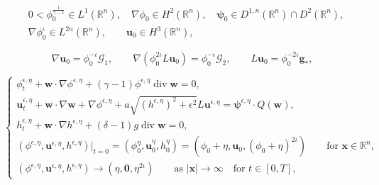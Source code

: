 \documentclass[10pt,a4paper]{amsart}
\DeclareMathOperator{\diver}{\mathrm{div}}
\begin{document}
\begin{equation}\label{th78qq}
\begin{aligned}
&0<\phi_0^\frac{1}{\gamma-1}\in L^1(\mathbb{R}^n),\quad \nabla\phi_0\in H^2 (\mathbb{R}^n),\quad \boldsymbol{\psi}_0 \in  D^{1,n}(\mathbb{R}^n)\cap  D^2(\mathbb{R}^n),\\
&\nabla\phi_0^\iota\in L^{2n}(\mathbb{R}^n),\qquad \boldsymbol{u}_0\in H^3(\mathbb{R}^n),
\end{aligned}
\end{equation}

\begin{equation}\label{th78zxq}
\nabla \boldsymbol{u}_0=\phi^{-\iota}_0 \mathcal{G}_1,\qquad
\nabla (\phi^{2\iota}_0L\boldsymbol{u}_0)=\phi^{-\iota}_0\mathcal{G}_2,\qquad  L\boldsymbol{u}_0= \phi^{-2\iota}_0\boldsymbol{g}_*,
\end{equation}

\begin{equation}\label{ln}
\begin{cases}
\phi^{\epsilon,\eta}_t+\boldsymbol{w}\cdot\nabla\phi^{\epsilon,\eta}+(\gamma-1)\phi^{\epsilon,\eta} \diver\boldsymbol{w}=0,\\[3pt]
\boldsymbol{u}^{\epsilon,\eta}_t+\boldsymbol{w}\cdot \nabla \boldsymbol{w}+\nabla\phi^{\epsilon,\eta}+a \sqrt {(h^{\epsilon,\eta})^2+\epsilon^2} L\boldsymbol{u}^{\epsilon,\eta}=\boldsymbol{\psi}^{\epsilon,\eta} \cdot Q(\boldsymbol{w}),\\[3pt]
h^{\epsilon,\eta}_t+\boldsymbol{w}\cdot \nabla h^{\epsilon,\eta}+(\delta-1)g\diver\boldsymbol{w}=0,\\[3pt]
(\phi^{\epsilon,\eta},\boldsymbol{u}^{\epsilon,\eta},h^{\epsilon,\eta})|_{t=0}=(\phi^\eta_0,\boldsymbol{u}^\eta_0,h^\eta_0)=(\phi_0+\eta,\boldsymbol{u}_0,(\phi_0+\eta)^{2\iota})\qquad  \text{for $\boldsymbol{x}\in\mathbb{R}^n$},\\[3pt]
(\phi^{\epsilon,\eta},\boldsymbol{u}^{\epsilon,\eta},h^{\epsilon,\eta})\to (\eta,\boldsymbol{0},\eta^{2\iota}) \qquad \text{as $|\boldsymbol{x}|\to \infty$} \quad \text{for $t\in [0,T]$},
\end{cases}
\end{equation}
\end{document}

